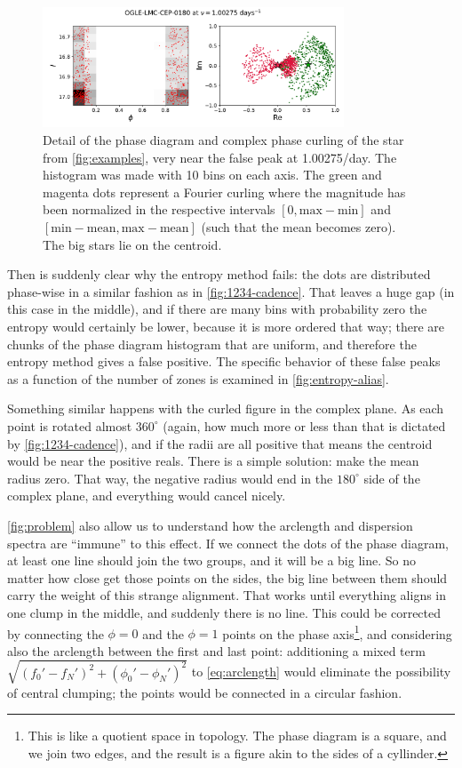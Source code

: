 \begin{figure}
	\centering
	\includegraphics[width=0.8\textwidth]{img/alias.pdf}
	\caption[Detail of the failure mode of Fourier and entropy methods]{
		Detail of the phase diagram and complex phase curling of the star from \autoref{fig:examples}, very near the false peak at 1.00275/day.
		The histogram was made with 10 bins on each axis.
		The green and magenta dots represent a Fourier curling where the magnitude has been normalized in the respective intervals 
		$[0,\text{max}-\text{min}]$ and $[\text{min}-\text{mean},\text{max}-\text{mean}]$ (such that the mean becomes zero).
		The big stars lie on the centroid.
	}
	\label{fig:problem}
\end{figure}

Then is suddenly clear why the entropy method fails: the dots are distributed phase-wise in a similar fashion as in \autoref{fig:1234-cadence}.
That leaves a huge gap (in this case in the middle), and if there are many bins with probability zero the entropy would certainly be lower,
because it is more ordered that way; there are chunks of the phase diagram histogram that are uniform, and therefore the entropy method gives a false positive.
The specific behavior of these false peaks as a function of the number of zones is examined in \autoref{fig:entropy-alias}.

Something similar happens with the curled figure in the complex plane. As each point is rotated almost $360^\circ$ 
(again, how much more or less than that is dictated by \autoref{fig:1234-cadence}), and if the radii are all positive that means the centroid would be near the positive reals.
There is a simple solution: make the mean radius zero. That way, the negative radius would end in the $180^\circ$ side of the complex plane, and everything would cancel nicely.

\autoref{fig:problem} also allow us to understand how the arclength and dispersion spectra are \enquote{immune} to this effect. 
If we connect the dots of the phase diagram,  at least one line should join the two groups, and it will be a big line.
So no matter how close get those points on the sides, the big line between them should carry the weight of this strange alignment.
That works until everything aligns in one clump in the middle, and suddenly there is no line.
This could be corrected by connecting the $\phi=0$ and the $\phi=1$ points on the phase axis\footnote{
	This is like a quotient space in topology. The phase diagram is a square, and we join two edges, 
	and the result is a figure akin to the sides of a cyllinder.
}, and considering also the arclength between the first and last point: 
additioning a mixed term $\sqrt{(f_0'-f_N')^2+(\phi_0'-\phi_N')^2}$ to \autoref{eq:arclength}
would eliminate the possibility of central clumping; the points would be connected in a circular fashion.

